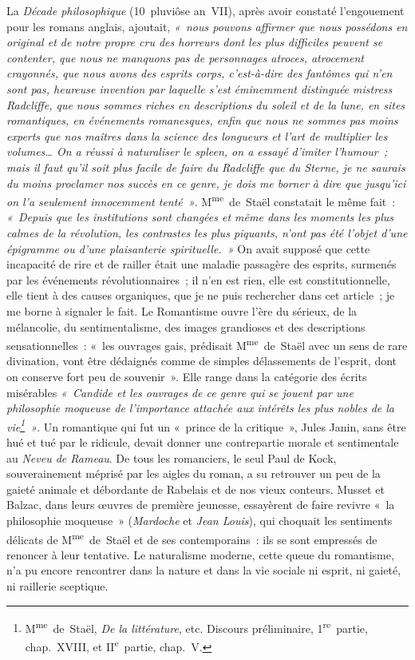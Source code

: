 \documentclass[french,twoside]{book} %
\begin{document}
La \emph{Décade philosophique} (10 pluviôse an VII), après avoir constaté l’engouement pour les romans anglais, ajoutait, \emph{« nous pouvons affirmer que nous possédons en original et de notre propre cru des horreurs dont les plus difficiles peuvent se contenter, que nous ne manquons pas de personnages atroces, atrocement crayonnés, que nous avons des {\itshape esprits corps}, c’est-à-dire des fantômes qui n’en sont pas, heureuse invention par laquelle s’est éminemment distinguée mistress Radcliffe, que nous sommes riches en descriptions du soleil et de la lune, en sites romantiques, en événements romanesques, enfin que nous ne sommes pas moins experts que nos maîtres dans la science des longueurs et l’art de multiplier les volumes… On a réussi à naturaliser le {\itshape spleen}, on a essayé d’imiter l’{\itshape humour} ; mais il faut qu’il soit plus facile de faire du Radcliffe que du Sterne, je ne saurais du moins proclamer nos succès en ce genre, je dois me borner à dire que jusqu’ici on l’a seulement innocemment tenté »}. M\textsuperscript{me} de Staël constatait le même fait : \emph{« Depuis que les institutions sont changées et même dans les moments les plus calmes de la révolution, les contrastes les plus  
\label{p589}piquants, n’ont pas été l’objet d’une épigramme ou d’une plaisanterie spirituelle. »} On avait supposé que cette incapacité de rire et de railler était une maladie passagère des esprits, surmenés par les événements révolutionnaires ; il n’en est rien, elle est constitutionnelle, elle tient à des causes organiques, que je ne puis rechercher dans cet article ; je me borne à signaler le fait. Le Romantisme ouvre l’ère du sérieux, de la mélancolie, du sentimentalisme, des images grandioses et des descriptions sensationnelles : « les ouvrages gais, prédisait M\textsuperscript{me} de Staël avec un sens de rare divination, vont être dédaignés comme de simples délassements de l’esprit, dont on conserve fort peu de souvenir ». Elle range dans la catégorie des écrits misérables \emph{« \emph{Candide} et les ouvrages de ce genre qui se jouent par une philosophie moqueuse de l’importance attachée aux intérêts les plus nobles de la vie\footnote{M\textsuperscript{me} de Staël, \emph{De la littérature}, etc. Discours préliminaire, 1\textsuperscript{re} partie, chap. XVIII, et II\textsuperscript{e} partie, chap. V.} »}. Un romantique qui fut un « prince de la critique », Jules Janin, sans être hué et tué par le ridicule, devait donner une contrepartie morale et sentimentale au \emph{Neveu de Rameau}. De tous les romanciers, le seul Paul de Kock, souverainement méprisé par les aigles du roman, a su retrouver un peu de la gaieté animale et débordante de Rabelais et de nos vieux conteurs. Musset et Balzac, dans leurs œuvres de première jeunesse, essayèrent de faire revivre « la philosophie moqueuse » (\emph{Mardoche} et \emph{Jean Louis}), qui choquait les sentiments délicats de M\textsuperscript{me} de Staël et de ses contemporains : ils se sont empressés de renoncer à leur tentative. Le naturalisme moderne, cette queue du romantisme, n’a pu encore rencontrer dans la nature et dans la vie sociale ni esprit, ni gaieté, ni raillerie sceptique.\par
\end{document}
